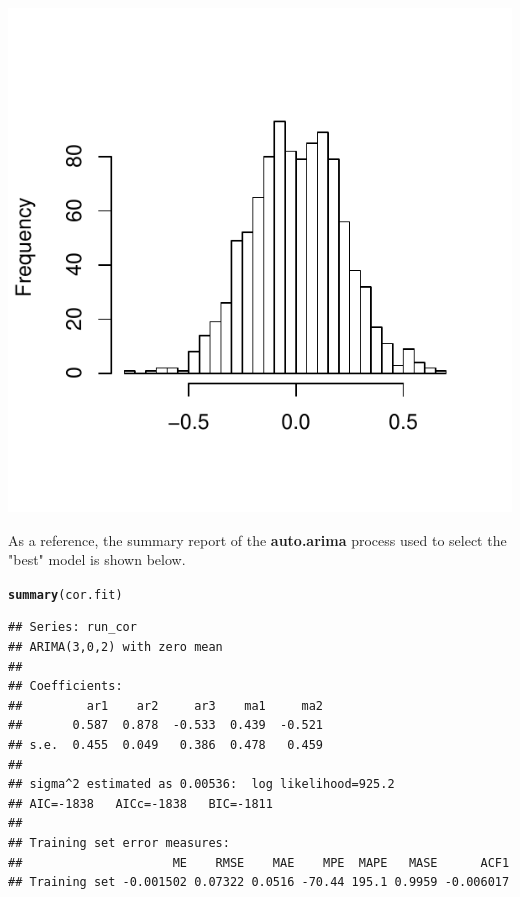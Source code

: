 \documentclass[10pt]{article}\usepackage[]{graphicx}\usepackage[]{color}
\makeatletter
\def\maxwidth{ %
  \ifdim\Gin@nat@width>\linewidth
    \linewidth
  \else
    \Gin@nat@width
  \fi
}
\newcommand{\hlstd}[1]{\textcolor[rgb]{0.345,0.345,0.345}{#1}}%
\newcommand{\hlkwd}[1]{\textcolor[rgb]{0.737,0.353,0.396}{\textbf{#1}}}%
\newenvironment{kframe}{%
 \def\at@end@of@kframe{}%
 \ifinner\ifhmode%
  \def\at@end@of@kframe{\end{minipage}}%
  \begin{minipage}{\columnwidth}%
 \fi\fi%
 \def\FrameCommand##1{\hskip\@totalleftmargin \hskip-\fboxsep
 \colorbox{shadecolor}{##1}\hskip-\fboxsep
     \hskip-\linewidth \hskip-\@totalleftmargin \hskip\columnwidth}%
 \MakeFramed {\advance\hsize-\width
   \@totalleftmargin\z@ \linewidth\hsize
   \@setminipage}}%
 {\par\unskip\endMakeFramed%
 \at@end@of@kframe}
\newenvironment{knitrout}{}{} %
\makeatother
\begin{document}
\begin{knitrout}
{\centering \includegraphics[width=\maxwidth]{figure/unnamed-chunk-203} 

}



\end{knitrout}

As a reference, the summary report of the \textbf{auto.arima} process used to select the "best" model is shown below.
\begin{knitrout}
\color{fgcolor}\begin{kframe}
\begin{alltt}
\hlkwd{summary}\hlstd{(cor.fit)}
\end{alltt}
\begin{verbatim}
## Series: run_cor 
## ARIMA(3,0,2) with zero mean     
## 
## Coefficients:
##         ar1    ar2     ar3    ma1     ma2
##       0.587  0.878  -0.533  0.439  -0.521
## s.e.  0.455  0.049   0.386  0.478   0.459
## 
## sigma^2 estimated as 0.00536:  log likelihood=925.2
## AIC=-1838   AICc=-1838   BIC=-1811
## 
## Training set error measures:
##                     ME    RMSE    MAE    MPE  MAPE   MASE      ACF1
## Training set -0.001502 0.07322 0.0516 -70.44 195.1 0.9959 -0.006017
\end{verbatim}
\end{kframe}
\end{knitrout}
\end{document}
